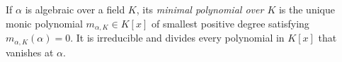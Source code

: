
If $\alpha$ is algebraic over a field $K$, its \emph{minimal polynomial over $K$} is the unique monic polynomial $m_{\alpha,K}\in K[x]$ of smallest positive degree satisfying $m_{\alpha,K}(\alpha)=0$. It is irreducible and divides every polynomial in $K[x]$ that vanishes at $\alpha$.
